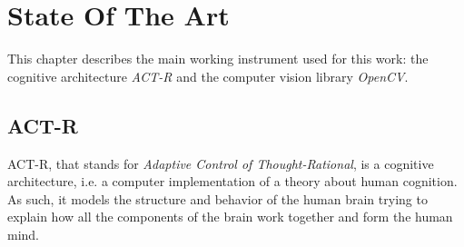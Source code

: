 \chapter{State Of The Art}\label{ch:state_of_the_art}
This chapter describes the main working instrument used for this work: the cognitive architecture \emph{\mbox{ACT-R}} and the computer vision library \emph{\mbox{OpenCV}}. 

	
	
  \section{ACT-R}
	\mbox{ACT-R}, that stands for \emph{Adaptive Control of Thought-Rational}, is a cognitive architecture, i.e. a computer implementation of a theory about human cognition. As such, it models the structure and behavior of the human brain trying to explain how all the components of the brain work together and form the human mind.

